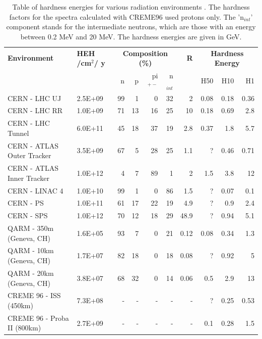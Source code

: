 
\begin{table}[htbp]
\small
  \centering
    \begin{tabular}{l|p{1.8cm}|r|r|r|r|r|r|r|r}
    \textbf{Environment} & \textbf{HEH /cm$^{2}$/ y} & \multicolumn{4}{c|}{\textbf{Composition (\%)}} & \textbf{R} & 				\multicolumn{3}{c}{\textbf{Hardness Energy}} \\ \cline{3-6} \cline{8-10}  
    & & n & p & pi$^{+-}$ & n$_{int}$ & & H50 & H10 & H1 \\
    \hline
    \hline
    CERN - LHC UJ 				& 2.5E+09 & 99    & 1     & 0     & 32    & 2     & 0.08  & 0.18  & 0.36 \\
    CERN - LHC RR 				& 1.0E+09 & 71    & 13    & 16    & 25    & 10    & 0.18  & 0.69  & 2.8 \\
    CERN - LHC Tunnel 			& 6.0E+11 & 45    & 18    & 37    & 19    & 2.8   & 0.37  & 1.8   & 5.7 \\
    CERN - ATLAS Outer Tracker 	& 3.5E+09 & 67    & 5     & 28    & 25    & 1.1   & ?     & 0.46  & 0.71 \\
    CERN - ATLAS Inner Tracker 	& 1.0E+12 & 4     & 7     & 89    & 1     & 2     & 1.5   & 3.8   & 12 \\
    CERN - LINAC 4 				& 1.0E+10 & 99    & 1     & 0     & 86    & 1.5   & ?     & 0.07  & 0.1 \\
    CERN - PS 					& 1.0E+11 & 61    & 17    & 22    & 19    & 4.9   & ?     & 0.9   & 2.4 \\
    CERN - SPS 					& 1.0E+12 & 70    & 12    & 18    & 29    & 48.9  & ?     & 0.94  & 5.1 \\
    QARM - 350m (Geneva, CH) 	& 1.6E+05 & 93    & 7     & 0     & 21    & 0.12  & 0.08  & 0.34  & 1.3 \\
    QARM - 10km (Geneva, CH) 	& 1.7E+07 & 82    & 18    & 0     & 18    & 0.08  & ?     & 0.92  & 5 \\
    QARM - 20km (Geneva, CH) 	& 3.8E+07 & 68    & 32    & 0     & 14    & 0.06  & 0.5   & 2.9   & 13 \\
    CREME 96 - ISS (450km) 		& 7.3E+08 & -     & -     & -     & -     & -     & ?     & 0.25  & 0.53 \\
    CREME 96 - Proba II (800km) & 2.7E+09 & -     & -     & -     & -     & -     & 0.1   & 0.28  & 1.5 \\
    \end{tabular}%
  \caption{Table of hardness energies for various radiation environments \cite{radecs2014shortcourse}. The hardness factors for the spectra calculated with CREME96 used protons only. The 'n$_{int}$' component stands for the intermediate neutrons, which are those with an energy between 0.2 MeV and 20 MeV. The hardness energies are given in GeV.}
  \label{tab:hardness_energies}%
\end{table}%

